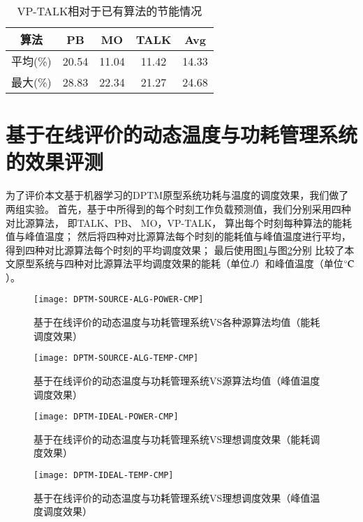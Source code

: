 \begin{table}
\centering
\caption{VP-TALK相对于已有算法的节能情况}
\begin{tabular}{c c c c c}
\hline\hline
算法 & PB & MO & TALK & Avg \\ [0.5ex]
\hline
平均(\%) & 20.54 & 11.04 & 11.42 & 14.33 \\
最大(\%) & 28.83 & 22.34 & 21.27 & 24.68 \\
\hline
\end{tabular}
\label{tab:chap3:vp-talk-cmp}
\end{table}

\section{基于在线评价的动态温度与功耗管理系统的效果评测}
为了评价本文基于机器学习的DPTM原型系统功耗与温度的调度效果，我们做了两组实验。
首先，基于中所得到的每个时刻工作负载预测值，我们分别采用四种对比源算法， 即TALK、PB、 MO，VP-TALK， 算出每个时刻每种算法的能耗值与峰值温度； 然后将四种对比源算法每个时刻的能耗值与峰值温度进行平均，得到四种对比源算法每个时刻的平均调度效果； 最后使用图\ref{fig:dptm-source-alg-power-cmp}与图\ref{fig:dptm-source-alg-temp-cmp}分别 比较了本文原型系统与四种对比源算法平均调度效果的能耗（单位$J$）和峰值温度（单位$\celsius$）。
\begin{figure}[H]
  \centering
  \texttt{[image: DPTM-SOURCE-ALG-POWER-CMP]}
  \caption{基于在线评价的动态温度与功耗管理系统VS各种源算法均值（能耗调度效果）}
  \label{fig:dptm-source-alg-power-cmp}
\end{figure}
\begin{figure}[H]
  \centering
  \texttt{[image: DPTM-SOURCE-ALG-TEMP-CMP]}
  \caption{基于在线评价的动态温度与功耗管理系统VS源算法均值（峰值温度调度效果）}
  \label{fig:dptm-source-alg-temp-cmp}
\end{figure}
\begin{figure}[H]
  \centering
  \texttt{[image: DPTM-IDEAL-POWER-CMP]}
  \caption{基于在线评价的动态温度与功耗管理系统VS理想调度效果（能耗调度效果）}
  \label{fig:dptm-ideal-power-cmp}
\end{figure}
\begin{figure}[H]
  \centering
  \texttt{[image: DPTM-IDEAL-TEMP-CMP]}
  \caption{基于在线评价的动态温度与功耗管理系统VS理想调度效果（峰值温度调度效果）}
  \label{fig:dptm-ideal-temp-cmp}
\end{figure}

